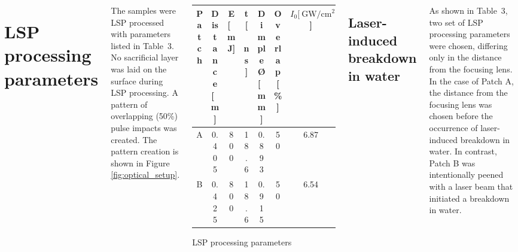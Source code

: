 \documentclass[20pt,margin=1in,innermargin=-4.5in,blockverticalspace=-0.25in]{tikzposter}
\begin{document}
\begin{columns}
{    \section*{LSP processing parameters}

    The samples were LSP processed with parameters listed in Table~3. No sacrificial layer was laid on the surface during LSP processing. A  pattern of overlapping (50\%) pulse impacts was created. The pattern creation is shown in Figure \ref{fig:optical_setup}.

    \begin{center}  

    \begin{threeparttable}
        \centering
        \begin{tabular}{|c|c | c| c| c| c| c|} 
        \hline
           \textbf{Patch} & \textbf{Distance [\SI{}{\m}]} & \textbf{E [\SI{}{\milli\joule}]} & \textbf{t [\SI{}{\ns}]} & \textbf{Dimple Ø [\SI{}{ \mm}]}  & \textbf{Overlap [\%] } & \textbf{\( I_0  [\SI[]{}{\giga\watt/\cm^2} \)] }\\ [0.5ex] 
  
        \hline
         A & 0.405 &  800   & 18.6 & 0.893 & 50 & 6.87  \\

        \hline
         B & 0.425 &  800   & 18.6 & 0.915 & 50 & 6.54  \\

        \hline
        \end{tabular}

        \caption[Litron~LPY~ST~7875-10~2HG parameters]{LSP processing parameters}
        
       
    \end{threeparttable}

    \label{tab:xrdparameters}
    \end{center}

    
    \subsection*{Laser-induced breakdown in water}
    As shown in Table~3, two set of LSP processing parameters were chosen, differing only in the distance from the focusing lens. In the case of Patch A, the distance from the focusing lens was chosen before the occurrence of laser-induced breakdown in water. In contrast, Patch B was intentionally peened with a laser beam that initiated a breakdown in water.  


}
\end{columns}
\end{document}
